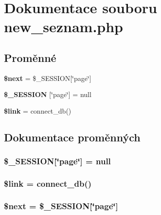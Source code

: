 \section{Dokumentace souboru new\_\-seznam.php}
\label{new__seznam_8php}
\subsection*{Proměnné}
\begin{CompactItemize}
\item 
{\bf \$next} = \$\_\-SESSION[\char`\"{}page\char`\"{}]
\item 
{\bf \$\_\-SESSION} [\char`\"{}page\char`\"{}] = null
\item 
{\bf \$link} = connect\_\-db()
\end{CompactItemize}


\subsection{Dokumentace proměnných}
\subsubsection{\setlength{\rightskip}{0pt plus 5cm}\$\_\-SESSION[\char`\"{}page\char`\"{}] = null}\label{new__seznam_8php_49aef95dde3b88cdc978b12cbbb95b26}


\subsubsection{\setlength{\rightskip}{0pt plus 5cm}\$link = connect\_\-db()}\label{new__seznam_8php_5d346e31b75d916e3bac9cb193bfc97f}


\subsubsection{\setlength{\rightskip}{0pt plus 5cm}\$next = \$\_\-SESSION[\char`\"{}page\char`\"{}]}\label{new__seznam_8php_c24f6189c7888ec50c77f7e65a837a62}


